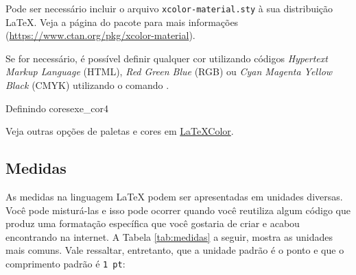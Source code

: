 \begin{marker}
  Pode ser necessário incluir o arquivo {\tt xcolor-material.sty} à sua distribuição \LaTeX{}. Veja a página do pacote para mais informações (\url{https://www.ctan.org/pkg/xcolor-material}).
\end{marker}

Se for necessário, é possível definir qualquer cor utilizando códigos \textit{Hypertext Markup Language} (HTML), \textit{Red Green Blue} (RGB) ou \textit{Cyan Magenta Yellow Black} (CMYK) utilizando o comando \texttt{\definecolor}.

\begin{texexptitled}[breakable,center lower,enhanced,middle=2mm]{Definindo cores}{exe_cor4}

\end{texexptitled}

\begin{marker}
Veja outras opções de paletas e cores em \href{http://latexcolor.com}{LaTeXColor}.
\end{marker}

\subsection{Medidas}
\label{sec:medidas}

As medidas na linguagem \LaTeX{} podem ser apresentadas em unidades diversas. Você pode misturá-las e isso pode ocorrer quando você reutiliza algum código que produz uma formatação específica que você gostaria de criar e acabou encontrando na internet. A Tabela \ref{tab:medidas} a seguir, mostra as unidades mais comuns. Vale ressaltar, entretanto, que a unidade padrão é o ponto e que o comprimento padrão é \texttt{1 pt}:

